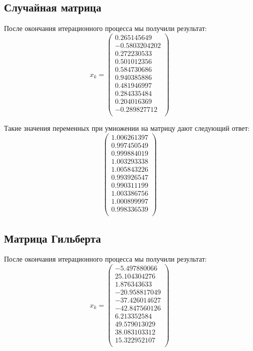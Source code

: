 \documentclass[../../report.tex]{subfiles}
\begin{document}
\subsection{Случайная матрица}
После окончания итерационного процесса мы получили результат:
\[
x_{k} = 
\begin{pmatrix}
    0.265145649 \\
  -0.5803204202 \\
    0.272230533 \\
    0.501012356 \\
    0.584730686 \\
    0.940385886 \\
    0.481946997 \\
    0.284335484 \\
    0.204016369 \\
   -0.289827712 \\
\end{pmatrix}
\]

Такие значения переменных при умножении на матрицу дают следующий ответ:
\[
\begin{pmatrix}
    1.006261397 \\
    0.997450549 \\
    0.999884019 \\
    1.003293338 \\
    1.005843226 \\
    0.993926547 \\
    0.990311199 \\
    1.003386756 \\
    1.000899997 \\
    0.998336539 \\
\end{pmatrix}
\]

\subsection{Матрица Гильберта}
После окончания итерационного процесса мы получили результат:
\[
x_{k} = 
\begin{pmatrix}
    -5.497880066 \\
    25.104304276 \\
     1.876343633 \\
   -20.958817049 \\
   -37.426014627 \\
   -42.847560126 \\
     6.213352584 \\
    49.579013029 \\
    38.083103312 \\
    15.322952107 \\
\end{pmatrix}
\]
\end{document}
